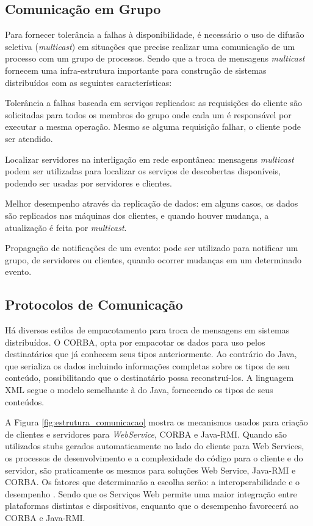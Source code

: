 \documentclass[
	12pt,				%
	oneside,			%
	a4paper,			%
	english,			%
	brazil				%
	]{abntex2ppgsi}
\begin{document}
\subsection{Comunicação em Grupo}

Para fornecer tolerância a falhas à disponibilidade, é necessário o uso de difusão seletiva (\textit{multicast}) em situações que precise realizar uma comunicação de um processo com um grupo de processos. Sendo que a troca de mensagens \textit{multicast} fornecem uma infra-estrutura importante para construção de sistemas distribuídos com as seguintes características:

\begin{itemize*}
	\item{Tolerância a falhas baseada em serviços replicados: as requisições do cliente são solicitadas para todos os membros do grupo onde cada um é responsável por executar a mesma operação. Mesmo se alguma requisição falhar, o cliente pode ser atendido.}
	\item{Localizar servidores na interligação em rede espontânea: mensagens \textit{multicast} podem ser utilizadas para localizar os serviços de descobertas disponíveis, podendo ser usadas por servidores e clientes.}
	\item{Melhor desempenho através da replicação de dados: em alguns casos, os dados são replicados nas máquinas dos clientes, e quando houver mudança, a atualização é feita por \textit{multicast}.}
	\item{Propagação de notificações de um evento: pode ser utilizado para notificar um grupo, de servidores ou clientes, quando ocorrer mudanças em um determinado evento.}
\end{itemize*}


\subsection{Protocolos de Comunicação}

Há diversos estilos de empacotamento para troca de mensagens em sistemas distribuídos. O CORBA, opta por empacotar os dados para uso pelos destinatários que já conhecem seus tipos anteriormente. Ao contrário do Java, que serializa os dados incluindo informações completas sobre os tipos de seu conteúdo, possibilitando que o destinatário possa reconstruí-los. A linguagem XML segue o modelo semelhante à do Java, fornecendo os tipos de seus conteúdos. 

A Figura \ref{fig:estrutura_comunicacao} mostra os mecanismos usados para criação de clientes e servidores para \textit{WebService}, CORBA e Java-RMI. Quando são utilizados stubs gerados automaticamente no lado do cliente para Web Services, os processos de desenvolvimento e a complexidade do código para o cliente e do servidor, são praticamente os mesmos para soluções Web Service, Java-RMI e CORBA. Os fatores que determinarão a escolha serão: a interoperabilidade e o desempenho \cite{gray2004comparison}. Sendo que os Serviços Web permite uma maior integração entre plataformas distintas e dispositivos, enquanto que o desempenho favorecerá ao CORBA e Java-RMI. 
\end{document}
